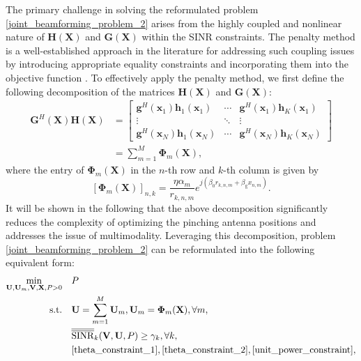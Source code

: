 The primary challenge in solving the reformulated problem \eqref{joint_beamforming_problem_2} arises from the highly coupled and nonlinear nature of $\mathbf{H}(\mathbf{X})$ and $\mathbf{G}(\mathbf{X})$ within the SINR constraints. The penalty method is a well-established approach in the literature for addressing such coupling issues by introducing appropriate equality constraints and incorporating them into the objective function \cite{liu2018mu, shi2020penalty, wu2020joint}. To effectively apply the penalty method, we first define the following decomposition of the matrices $\mathbf{H}(\mathbf{X})$ and $\mathbf{G}(\mathbf{X})$:
\begin{align} \label{PH_formula}
    \mathbf{G}^H(\mathbf{X}) \mathbf{H}(\mathbf{X})  
    & = \begin{bmatrix}
        \mathbf{g}^H(\mathbf{x}_1) \mathbf{h}_1(\mathbf{x}_1) & \!\! \cdots \!\! & \mathbf{g}^H(\mathbf{x}_1) \mathbf{h}_K(\mathbf{x}_1) \\ \vdots & \!\! \ddots \!\!  & \vdots \\
        \mathbf{g}^H(\mathbf{x}_N) \mathbf{h}_1(\mathbf{x}_N) & \!\! \cdots \!\! & \mathbf{g}^H(\mathbf{x}_N) \mathbf{h}_K(\mathbf{x}_N)
    \end{bmatrix} \nonumber \\ &= \sum_{m=1}^M \mathbf{\Phi}_m(\mathbf{X}),
\end{align}
where the entry of $\mathbf{\Phi}_m(\mathbf{X})$ in the $n$-th row and $k$-th column is given by 
\begin{equation}
   \left[ \mathbf{\Phi}_m(\mathbf{X}) \right]_{n,k} = \frac{\eta \alpha_m }{r_{k,n,m}} e^{j\left( \beta_0 r_{k,n,m} + \beta_{\mathrm{g}} x_{n,m} \right)}.
\end{equation}
It will be shown in the following that the above decomposition significantly reduces the complexity of optimizing the pinching antenna positions and addresses the issue of multimodality. Leveraging this decomposition, problem \eqref{joint_beamforming_problem_2} can be reformulated into the following equivalent form:
\begin{subequations} \label{joint_beamforming_problem_3}
    \begin{align}
        \min_{\mathbf{U}, \mathbf{U}_m, \mathbf{V}, \mathbf{X}, P > 0} \quad & P \\
        \label{joint_beamforming_problem_3_0}
        \mathrm{s.t.} \quad & \mathbf{U} = \sum_{m=1}^M \mathbf{U}_m, \mathbf{U}_m = \mathbf{\Phi}_m(\mathbf{X}), \forall m, \\
        \label{joint_beamforming_problem_3_1}
        & \overline{\overline{\mathrm{SINR}}}_k(\mathbf{V}, \mathbf{U}, P)  \ge \gamma_k, \forall k, \\
        & \eqref{theta_constraint_1}, \eqref{theta_constraint_2}, \eqref{unit_power_constraint},
    \end{align}
\end{subequations}
